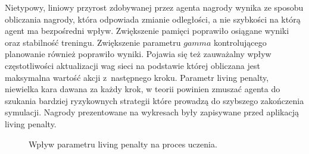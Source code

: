 \documentclass[12pt, oneside]{article}
\begin{document}
Nietypowy, liniowy przyrost zdobywanej przez agenta nagrody wynika ze sposobu obliczania nagrody, która odpowiada zmianie odległości, a nie szybkości na którą agent ma bezpośredni wpływ. Zwiększenie pamięci poprawiło osiągane wyniki oraz stabilność treningu. Zwiększenie parametru $gamma$ kontrolującego planowanie również poprawiło wyniki. Pojawia się też zauważalny wpływ częstotliwości aktualizacji wag sieci na podstawie której obliczana jest maksymalna wartość akcji z~następnego kroku.
\newpage
Parametr living penalty, niewielka kara dawana za każdy krok, w teorii powinien zmuszać agenta do szukania bardziej ryzykownych strategii które prowadzą do szybszego zakończenia symulacji. Nagrody prezentowane na wykresach były zapisywane przed aplikacją living penalty.
\begin{figure}[h]
    \caption{Wpływ parametru living penalty na proces uczenia.}
    \label{lp}
\end{figure}
\end{document}
